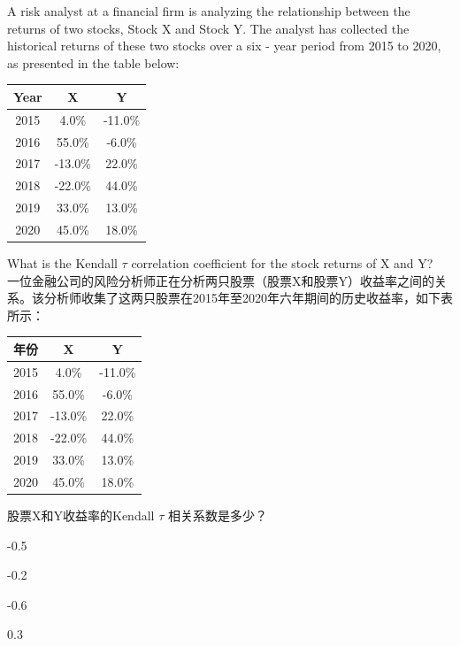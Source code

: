 \documentclass{article}
\newcounter{question} %
\begin{document}
    \begin{question}
        A risk analyst at a financial firm is analyzing the relationship between the returns of two stocks, Stock X and Stock Y. The analyst has collected the historical returns of these two stocks over a six - year period from 2015 to 2020, as presented in the table below:
        \begin{center}
        \begin{tabular}{|c|c|c|}
        \hline
        Year & X & Y \\
        \hline
        2015 & 4.0\% & -11.0\% \\
        \hline
        2016 & 55.0\% & -6.0\% \\
        \hline
        2017 & -13.0\% & 22.0\% \\
        \hline
        2018 & -22.0\% & 44.0\% \\
        \hline
        2019 & 33.0\% & 13.0\% \\
        \hline
        2020 & 45.0\% & 18.0\% \\
        \hline
        \end{tabular}
        \end{center}
        What is the Kendall $\tau$ correlation coefficient for the stock returns of X and Y?
        \\一位金融公司的风险分析师正在分析两只股票（股票X和股票Y）收益率之间的关系。该分析师收集了这两只股票在2015年至2020年六年期间的历史收益率，如下表所示：
        \begin{center}
        \begin{tabular}{|c|c|c|}
        \hline
        年份 & X & Y \\
        \hline
        2015 & 4.0\% & -11.0\% \\
        \hline
        2016 & 55.0\% & -6.0\% \\
        \hline
        2017 & -13.0\% & 22.0\% \\
        \hline
        2018 & -22.0\% & 44.0\% \\
        \hline
        2019 & 33.0\% & 13.0\% \\
        \hline
        2020 & 45.0\% & 18.0\% \\
        \hline
        \end{tabular}
        \end{center}
        股票X和Y收益率的Kendall $\tau$ 相关系数是多少？
        \end{question}
        
        \begin{choices}
            \item -0.5
            \item -0.2
            \item -0.6
            \item 0.3
        \end{choices}
        
\end{document}
